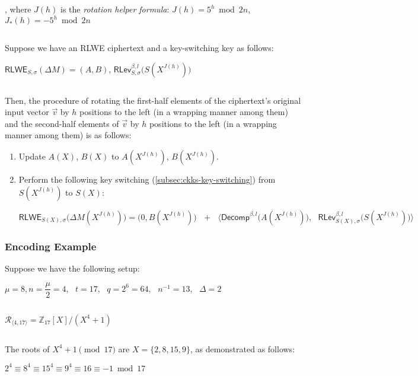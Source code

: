 \begin{tcolorbox}[title={\textbf{\tboxlabel{\ref*{subsec:bfv-rotation}} BFV's Homomorphic Rotation of Input Vector Slots}}]
$ $

$ $


, where $J(h)$ is the \textit{rotation helper formula}: $J(h) = 5^h \bmod 2n$, \text{ } $J_*(h) = -5^h \bmod 2n$

$ $

Suppose we have an RLWE ciphertext and a key-switching key as follows:

$\textsf{RLWE}_{S, \sigma}(\Delta M) = (A, B)$, \text{ } $\textsf{RLev}_{S, \sigma}^{\beta, l}\bm(S(X^{J(h)})\bm)$

$ $

Then, the procedure of rotating the first-half elements of the ciphertext's original input vector $\vec{v}$ by $h$ positions to the left (in a wrapping manner among them) and the second-half elements of $\vec{v}$ by $h$ positions to the left (in a wrapping manner among them) is as follows: 

\begin{enumerate}
\item Update $A(X)$, $B(X)$ to $A(X^{J(h)})$, $B(X^{J(h)})$. 
\item Perform the following key switching (\autoref{subsec:ckks-key-switching}) from $S(X^{J(h)})$ to $S(X)$:

$\textsf{RLWE}_{S(X),\sigma}\bm{(}\Delta M(X^{J(h)})\bm{)} = \bm{(} 0, B(X^{J(h)}) \bm{)} \text{ } + \text{ } \bm{\langle}  \textsf{Decomp}^{\beta, l}\bm{(}A(X^{J(h)})\bm{)}, \text{ } \textsf{RLev}_{S(X), \sigma}^{\beta, l}\bm{(}S(X^{J(h)})\bm{)} \bm{\rangle}$
\end{enumerate}


\end{tcolorbox}


\subsubsection{Encoding Example}
\label{subsubsec:bfv-batch-encoding-ex}

Suppose we have the following setup: 

$\mu = 8, n = \dfrac{\mu}{2} = 4, \text{ } t = 17, \text{ } q = 2^6 = 64, \text{ } n^{-1} = 13, \text{ } \Delta = 2$

$ $

$\mathcal{R}_{\langle 4, 17 \rangle} = \mathbb{Z}_{17}[X] / (X^4 + 1)$

$ $

The roots of $X^4 + 1 \pmod{17}$ are $X = \{2, 8, 15, 9\}$, as demonstrated as follows:

$2^4 \equiv 8^4 \equiv 15^4 \equiv 9^4 \equiv 16 \equiv -1 \bmod{17}$

